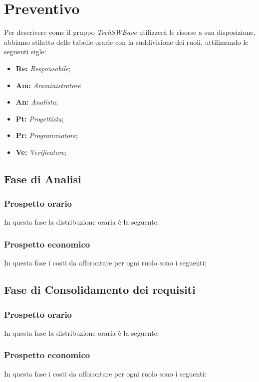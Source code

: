 \section{Preventivo}
Per descrivere come il gruppo \emph{TechSWEave} utilizzerà le risorse a sua disposizione, abbiamo stilatto delle tabelle orarie con la suddivisione dei ruoli, uttilizzando le seguenti sigle:
\begin{itemize}
    \item \textbf{Re: }\emph{Responsabile};
    \item \textbf{Am: }\emph{Amministratore}
    \item \textbf{An: }\emph{Analista};
    \item \textbf{Pt: }\emph{Progettista};
    \item \textbf{Pr: }\emph{Programmatore};
    \item \textbf{Ve: }\emph{Verificatore};
\end{itemize}

\subsection{Fase di Analisi}
    \subsubsection{Prospetto orario}
    In questa fase la distribuzione oraria è la seguente:
    \subsubsection{Prospetto economico}
    In questa fase i costi da afforontare per ogni ruolo sono i seguenti:
\subsection{Fase di Consolidamento dei requisiti}
    \subsubsection{Prospetto orario}
    In questa fase la distribuzione oraria è la seguente:
    \subsubsection{Prospetto economico}
    In questa fase i costi da afforontare per ogni ruolo sono i seguenti:
